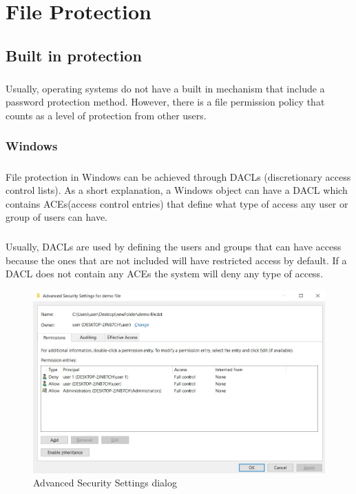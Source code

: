 \chapter{File Protection}
	\section{Built in protection}
	\paragraph{}
	Usually, operating systems do not have a built in mechanism that include a password protection method. However, there is a file permission policy that counts as a level of protection from other users.
	
	\subsection{Windows}
	\paragraph{}
	File protection in Windows can be achieved through DACLs (discretionary access control lists). As a short explanation, a Windows object can have a DACL which contains ACEs(access control entries) that define what type of access any user or group of users can have. \cite{MDSNDACsLACEs}
	
	\paragraph{}
	Usually, DACLs are used by defining the users and groups that can have access because the ones that are not included will have restricted access by default. If a DACL does not contain any ACEs the system will deny any type of access.
	
	\begin{figure}[h!]
		\includegraphics[width=\linewidth]{images/securitySettings.jpg}
		\caption{Advanced Security Settings dialog}
		\label{fig:securitySettings}
	\end{figure}
	
